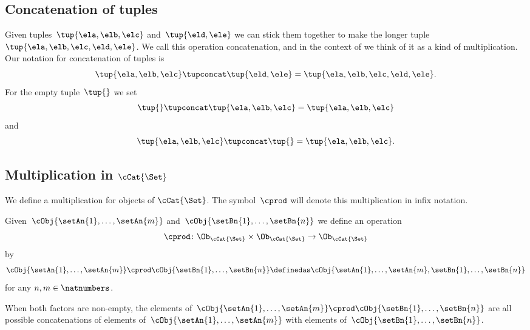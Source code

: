 \subsection{Concatenation of tuples}

Given tuples~$\tup{\ela, \elb, \elc}$ and~$\tup{\eld, \ele}$ we can stick them together to make the longer tuple~$\tup{\ela, \elb, \elc, \eld, \ele}$.
We call this operation concatenation, and in the context of \cCat{\Set} we think of it as a kind of multiplication.
Our notation for concatenation of tuples is
\begin{equation*}
    \tup{\ela, \elb, \elc} \tupconcat \tup{\eld, \ele} = \tup{\ela, \elb, \elc, \eld, \ele}.
\end{equation*}
For the empty tuple~$\tup{  }$ we set
\begin{equation*}
    \tup{} \tupconcat \tup{\ela, \elb, \elc}  = \tup{\ela, \elb, \elc}
\end{equation*}
and
\begin{equation*}
    \tup{\ela, \elb, \elc}  \tupconcat \tup{ } = \tup{\ela, \elb, \elc}.
\end{equation*}

\subsection{Multiplication in $\cCat{\Set}$}

We define a multiplication for objects of $\cCat{\Set}$.
The symbol~$\cprod$ will denote this multiplication in infix notation.

Given~$\cObj{\setAn{1}, \ldots, \setAn{m}}$ and~$\cObj{\setBn{1}, \ldots, \setBn{n}}$ we define
an operation
\begin{equation*}
    \cprod \colon \Ob_{\cCat{\Set}} \times \Ob_{\cCat{\Set}} \to \Ob_{\cCat{\Set}}
\end{equation*}
by
\begin{equation}
    \label{eq:strict-monoidal-product-sets}
    \cObj{\setAn{1}, \ldots, \setAn{m}} \cprod \cObj{\setBn{1}, \ldots, \setBn{n}} \definedas \cObj{\setAn{1}, \ldots, \setAn{m}, \setBn{1},  \ldots, \setBn{n}}
\end{equation}
for any $n, m \in \natnumbers$.

When both factors are non-empty, the elements of~$\cObj{\setAn{1}, \ldots, \setAn{m}} \cprod \cObj{\setBn{1}, \ldots, \setBn{n}}$ are all possible concatenations of elements of~$\cObj{\setAn{1}, \ldots, \setAn{m}}$ with elements of~$\cObj{\setBn{1}, \ldots, \setBn{n}}$.

